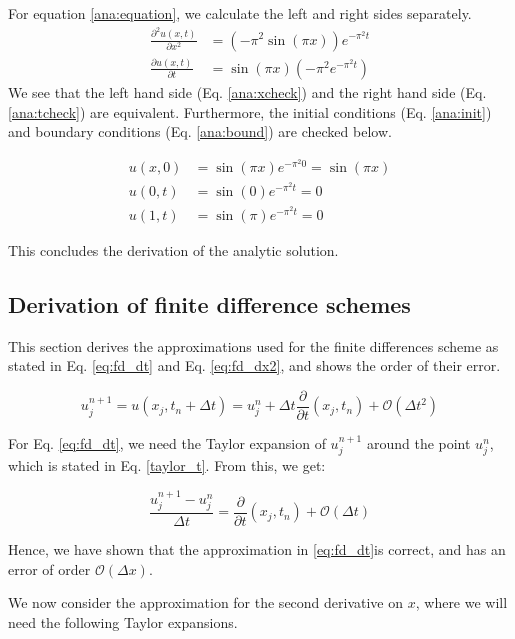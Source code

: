 For equation \ref{ana:equation}, we calculate the left and right sides separately.
\begin{align}
    \label{ana:xcheck}
    \frac{\partial^2 u(x,t)}{\partial x^2} &= \left(-\pi^2 \sin(\pi x)\right) e^{-\pi^2 t} \\
    \label{ana:tcheck}
    \frac{\partial u(x,t)}{\partial t} &=  \sin(\pi x) \left(-\pi^2 e^{-\pi^2 t}\right)
\end{align}
We see that the left hand side (Eq. \ref{ana:xcheck}) and the right hand side (Eq. \ref{ana:tcheck}) are equivalent.
Furthermore, the initial conditions (Eq. \ref{ana:init}) and boundary conditions (Eq. \ref{ana:bound}) are checked below.

\begin{align*}
    u(x, 0) &= \sin(\pi x) e^{-\pi^2 0} = \sin(\pi x) \\
    u(0, t) &= \sin(0)e^{-\pi^2 t} = 0 \\
    u(1, t) &= \sin(\pi)e^{-\pi^2 t} = 0
\end{align*}

This concludes the derivation of the analytic solution.
\clearpage

\subsection{Derivation of finite difference schemes} \label{appendixC}
This section derives the approximations used for the finite differences scheme as stated in Eq. \eqref{eq:fd_dt} and Eq. \eqref{eq:fd_dx2}, and shows the order of their error.

\begin{equation} \label{taylor_t}
    u_j^{n+1} = u(x_j, t_n + \Delta t)
    = u_j^n + \Delta t \frac{\partial}{\partial t}(x_j, t_n) + \mathcal{O}(\Delta t^2)
\end{equation}

For Eq. \eqref{eq:fd_dt}, we need the Taylor expansion of $u_j^{n+1}$ around the point $u_j^n$, which is stated in Eq. \eqref{taylor_t}.
From this, we get:

\begin{equation}
    \frac{u_j^{n+1} - u_j^n}{\Delta t} = \frac{\partial}{\partial t}(x_j, t_n) + \mathcal{O}(\Delta t)
\end{equation}

Hence, we have shown that the approximation in \eqref{eq:fd_dt}is correct, and has an error of order $\mathcal{O}(\Delta x)$.

We now consider the approximation for the second derivative on $x$, where we will need the following Taylor expansions.

